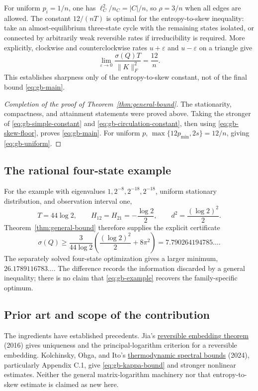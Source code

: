 For uniform $p_i=1/n$, one has $\ell_C^2/n_C=|C|/n$, so
$\rho=3/n$ when all edges are allowed. The constant $12/(nT)$ is
optimal for the entropy-to-skew inequality: take an almost-equilibrium
three-state cycle with the remaining states isolated, or connected
by arbitrarily weak reversible rates if irreducibility is required.
More explicitly, clockwise and counterclockwise rates $u+\varepsilon$
and $u-\varepsilon$ on a triangle give
\[
 \lim_{\varepsilon\to0}
 \frac{\sigma(Q)T}{\|K\|_F^2}=\frac{12}{n}.
\]
This establishes sharpness only of the entropy-to-skew constant, not
of the final bound \eqref{eq:gb-main}.

\begin{proof}[Completion of the proof of Theorem~\ref{thm:general-bound}]
The stationarity, compactness, and attainment statements were proved
above. Taking the stronger of \eqref{eq:gb-simple-constant} and
\eqref{eq:gb-circulation-constant}, then using
\eqref{eq:gb-skew-floor}, proves \eqref{eq:gb-main}. For uniform $p$,
$\max\{12p_{\min},2s\}=12/n$, giving
\eqref{eq:gb-uniform}.
\end{proof}

\subsection{The rational four-state example}

For the example with eigenvalues $1,2^{-8},2^{-18},2^{-18}$, uniform
stationary distribution, and observation interval one,
\[
 T=44\log2,\qquad H_{12}=H_{21}=-\frac{\log2}{2},\qquad
 d^2=\frac{(\log2)^2}{2}.
\]
Theorem~\ref{thm:general-bound} therefore supplies the explicit
certificate
\begin{equation}
 \sigma(Q)\geq
 \frac{3}{44\log2}
 \left(\frac{(\log2)^2}{2}+8\pi^2\right)
 =7.790264194785\ldots .
 \label{eq:gb-example}
\end{equation}
The separately solved four-state optimization gives a larger minimum,
$26.1789116783\ldots$. The difference records the information discarded
by a general inequality; there is no claim that
\eqref{eq:gb-example} recovers the family-specific optimum.

\subsection{Prior art and scope of the contribution}

The ingredients have established precedents. Jia's
\href{https://arxiv.org/abs/1605.03502}{reversible embedding theorem}
(2016) gives uniqueness and the principal-logarithm criterion for a
reversible embedding. Kolchinsky, Ohga, and Ito's
\href{https://arxiv.org/html/2304.01714v4}{thermodynamic spectral bounds}
(2024), particularly Appendix C.1, give
\eqref{eq:gb-kappa-bound} and stronger nonlinear estimates. Neither
the general matrix-logarithm machinery nor that entropy-to-skew
estimate is claimed as new here.

